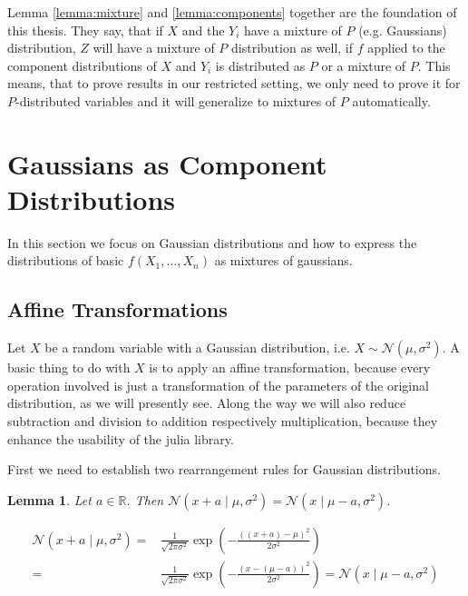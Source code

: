\documentclass[11pt,a4paper]{book}
\newtheorem{lemma}{Lemma}
\begin{document}
Lemma \ref{lemma:mixture} and \ref{lemma:components} together are the foundation
of this thesis. They say, that if $X$ and the $Y_{i}$ have a mixture of $P$
(e.g. Gaussians) distribution, $Z$ will have a mixture of $P$ distribution as
well, if $f$ applied to the component distributions of $X$ and $Y_{i}$ is
distributed as $P$ or a mixture of $P$. This means, that to prove results in our
restricted setting, we only need to prove it for $P$-distributed variables and
it will generalize to mixtures of $P$ automatically.

\section{Gaussians as Component Distributions}
\label{sec:gaussians}

In this section we focus on Gaussian distributions and how to express the
distributions of basic $f(X_{1}, \dots, X_{n})$ as mixtures of gaussians.

\subsection{Affine Transformations}
\label{sec:affine-transforms}

Let $X$ be a random variable with a Gaussian distribution, i.e.
$X \sim \mathcal{N}(\mu, \sigma^{2})$. A basic thing to do with $X$ is to apply
an affine transformation, because every operation involved is just a
transformation of the parameters of the original distribution, as we will
presently see. Along the way we will also reduce subtraction and division to
addition respectively multiplication, because they enhance the usability of the
julia library.

First we need to establish two rearrangement rules for Gaussian distributions.
\begin{lemma}
  \label{lemma:x-mu-symmetry}
  Let $a \in \mathbb{R}$. Then
  $\mathcal{N}(x + a \mid \mu, \sigma^{2}) = \mathcal{N}(x \mid \mu - a,
  \sigma^{2})$.
\end{lemma}
\begin{proof2}
  \begin{align*}
    \mathcal{N}(x + a \mid \mu, \sigma^{2}) = & \frac{1}{\sqrt{2 \pi \sigma^{2}}} \exp\left( - \frac{\left((x + a) - \mu \right)^{2}}{2\sigma^{2}} \right)\\
    = & \frac{1}{\sqrt{2 \pi \sigma^{2}}} \exp\left( - \frac{\left(x - (\mu - a) \right)^{2}}{2\sigma^{2}} \right) = \mathcal{N}(x \mid \mu - a, \sigma^{2})
  \end{align*}
\end{proof2}
\end{document}
